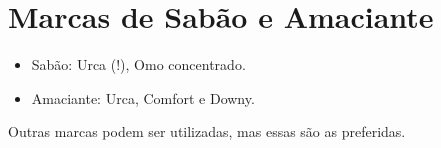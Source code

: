 \documentclass[12pt]{article}
\begin{document}
\section*{Marcas de Sabão e Amaciante}

\begin{itemize}
    \item Sabão: Urca (!), Omo concentrado. 
    \item Amaciante: Urca, Comfort e Downy. 
\end{itemize}

Outras marcas podem ser utilizadas, mas essas são as preferidas.
\end{document}
